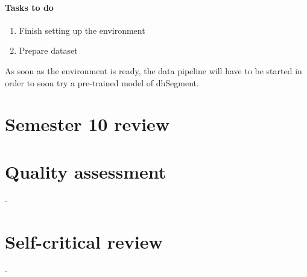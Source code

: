 \documentclass{polytech/polytech}
\numberwithin{figure}{chapter}
\begin{document}
\paragraph{Tasks to do}

\begin{enumerate}
\item Finish setting up the environment
\item Prepare dataset
\end{enumerate}

As soon as the environment is ready, the data pipeline will have to be started in order to soon try a pre-trained model of dhSegment.

\section{Semester 10 review}


\section{Quality assessment}

-

\section{Self-critical review}

-
\end{document}
